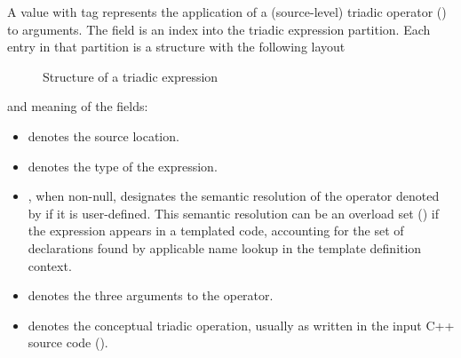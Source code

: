 A  value with tag  represents the application of a (source-level) triadic operator () to arguments.
The  field is an index into the triadic expression partition.
Each entry in that partition is a structure with the following layout
%
\begin{figure}[H]
	\centering
	\caption{Structure of a triadic expression}
	\label{fig:ifc-triadic-expression-structure}
\end{figure}
%
and meaning of the fields:
\begin{itemize}
	\item {} denotes the source location.
	\item {} denotes the type of the expression.
	\item {}, when non-null, designates the semantic resolution of the operator denoted by  if it is user-defined.
	This semantic resolution can be an overload set () if the expression appears in a templated code,
	accounting for the set of declarations found by applicable name lookup in the template definition context.
	\item {} denotes the three arguments to the operator.
	\item {} denotes the conceptual triadic operation, usually as written in the input C++ source code
	().
\end{itemize}



\subsection{}
\label{sec:ifc:ExprSort:String}

